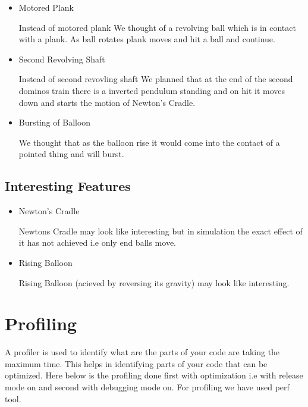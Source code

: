 \documentclass[a4paper,11pt]{article}
\begin{document}
\begin{itemize}
\item {Motored Plank}
\begin{description} Instead of motored plank We thought of a revolving ball which is in contact with a plank. As ball rotates plank moves and hit a ball and continue.
\end{description}

\item {Second Revolving Shaft}
\begin{description} Instead of second revovling shaft We planned that at the end of the second dominos train there is a inverted pendulum standing and on hit it moves down and starts the motion of Newton's Cradle.
\end{description}

\item{Bursting of Balloon}
\begin{description} We thought that as the balloon rise it would come into the contact of a pointed thing and will burst.
\end{description}
\end{itemize}

\subsection{Interesting Features}
\begin{itemize}
\item {Newton's Cradle}
\begin{description} Newtons Cradle may look like interesting but in simulation the exact effect of it has not achieved i.e only end balls move.
\end{description}

\item {Rising Balloon}
\begin{description} Rising Balloon (acieved by reversing its gravity) may look like interesting.
\end{description}
\end{itemize}


\section{Profiling}
A profiler is used to identify what are the parts of your code are taking the maximum time. This helps in identifying parts of your code that can be optimized. Here below is the profiling done first with optimization i.e with release mode on and second with debugging mode on. For profiling we have used perf tool.
\end{document}
